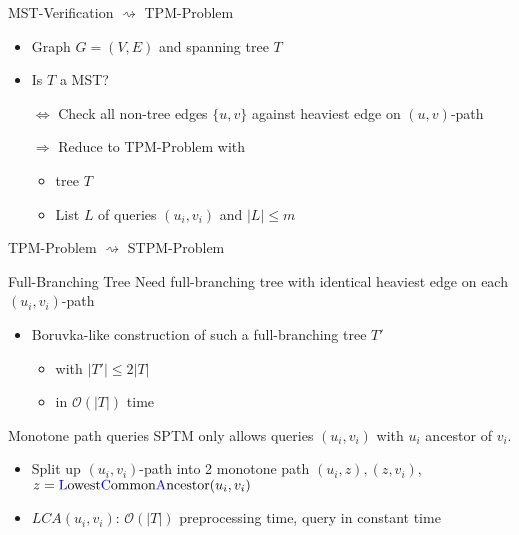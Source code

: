 \documentclass[18pt]{beamer}
\begin{document}
\begin{frame}{MST-Verification $	\rightsquigarrow$ TPM-Problem}
	\begin{itemize}
		\item Graph $G=(V,E)$ and spanning tree $T$
		\item Is $T$ a MST? 
		\item [$\Leftrightarrow$] Check all non-tree edges $\{u,v\}$ against heaviest edge on $(u,v)$-path
		
		\bigskip
		\pause
		\item [$\Rightarrow$] Reduce to TPM-Problem with 
		\begin{itemize}
			\item tree $T$
			\item List $L$ of queries $(u_i,v_i)$ and $|L| \le m$
		\end{itemize}
	\end{itemize}
\end{frame}
\begin{frame}{TPM-Problem $	\rightsquigarrow$ STPM-Problem}
	\begin{block}{Full-Branching Tree}
		Need {\color{blue} full-branching tree} with identical heaviest edge on each $(u_i,v_i)$-path
	\end{block}
	\begin{itemize}
		\item Boruvka-like construction of such a full-branching tree $T'$
		\begin{itemize}
			\item with $|T'| \le 2|T|$
			\item in $\mathcal{O}(|T|)$ time
		\end{itemize}
	\end{itemize}
	\bigskip
	\pause
	\begin{block}{Monotone path queries}
		SPTM only allows queries $(u_i,v_i)$ with $u_i$ ancestor of $v_i$.
	\end{block}
	\begin{itemize}
	\item Split up $(u_i,v_i)$-path into 2 monotone path $(u_i,z), (z, v_i)$,  \\ $z = \textup{{\color{blue}L}owest{\color{blue}C}ommon{\color{blue}A}ncestor}(u_i,v_i)$
	\item $LCA(u_i,v_i)$: $\mathcal{O}(|T|)$ preprocessing time, query in constant time
	\end{itemize}
\end{frame}
\end{document}
